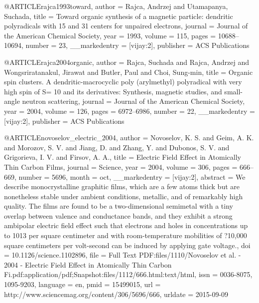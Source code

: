 @ARTICLE{rajca1993toward,
  author = {Rajca, Andrzej and Utamapanya, Suchada},
  title = {Toward organic synthesis of a magnetic particle: dendritic polyradicals
	with 15 and 31 centers for unpaired electrons},
  journal = {Journal of the American Chemical Society},
  year = {1993},
  volume = {115},
  pages = {10688--10694},
  number = {23},
  __markedentry = {[vijay:2]},
  publisher = {ACS Publications}
}

@ARTICLE{rajca2004organic,
  author = {Rajca, Suchada and Rajca, Andrzej and Wongsriratanakul, Jirawat and
	Butler, Paul and Choi, Sung-min},
  title = {Organic spin clusters. A dendritic-macrocyclic poly (arylmethyl)
	polyradical with very high spin of S= 10 and its derivatives: Synthesis,
	magnetic studies, and small-angle neutron scattering},
  journal = {Journal of the American Chemical Society},
  year = {2004},
  volume = {126},
  pages = {6972--6986},
  number = {22},
  __markedentry = {[vijay:2]},
  publisher = {ACS Publications}
}

@ARTICLE{novoselov_electric_2004,
  author = {Novoselov, K. S. and Geim, A. K. and Morozov, S. V. and Jiang, D.
	and Zhang, Y. and Dubonos, S. V. and Grigorieva, I. V. and Firsov,
	A. A.},
  title = {Electric {Field} {Effect} in {Atomically} {Thin} {Carbon} {Films}},
  journal = {Science},
  year = {2004},
  volume = {306},
  pages = {666--669},
  number = {5696},
  month = oct,
  __markedentry = {[vijay:2]},
  abstract = {We describe monocrystalline graphitic films, which are a few atoms
	thick but are nonetheless stable under ambient conditions, metallic,
	and of remarkably high quality. The films are found to be a two-dimensional
	semimetal with a tiny overlap between valence and conductance bands,
	and they exhibit a strong ambipolar electric field effect such that
	electrons and holes in concentrations up to 1013 per square centimeter
	and with room-temperature mobilities of ?10,000 square centimeters
	per volt-second can be induced by applying gate voltage.},
  doi = {10.1126/science.1102896},
  file = {Full Text PDF:files/1110/Novoselov et al. - 2004 - Electric Field Effect in Atomically Thin      Carbon Fi.pdf:application/pdf;Snapshot:files/1112/666.html:text/html},
  issn = {0036-8075, 1095-9203},
  language = {en},
  pmid = {15499015},
  url = {http://www.sciencemag.org/content/306/5696/666},
  urldate = {2015-09-09}
}

